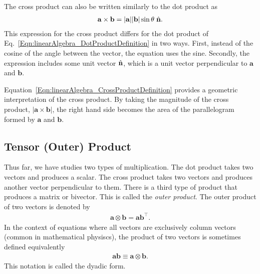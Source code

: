 The cross product can also be written similarly to the dot product as
\begin{align} \label{Eqn:linearAlgebra_CrossProductDefinition}
  \mathbf{a} \times \mathbf{b} = | \mathbf{a} | | \mathbf{b} | \sin \theta \hspace{0.1cm} \hat{\mathbf{n}}.
\end{align}
This expression for the cross product differs for the dot product of Eq.~\eqref{Eqn:linearAlgebra_DotProductDefinition} in two ways. First, instead of the cosine of the angle between the vector, the equation uses the sine. Secondly, the expression includes some unit vector $\hat{\mathbf{n}}$, which is a unit vector perpendicular to $\mathbf{a}$ and $\mathbf{b}$.

Equation~\eqref{Eqn:linearAlgebra_CrossProductDefinition} provides a geometric interpretation of the cross product. By taking the magnitude of the cross product, $| \mathbf{a} \times \mathbf{b} |$, the right hand side becomes the area of the parallelogram formed by $\mathbf{a}$ and $\mathbf{b}$.

\subsection{Tensor (Outer) Product}

Thus far, we have studies two types of multiplication. The dot product takes two vectors and produces a scalar. The cross product takes two vectors and produces another vector perpendicular to them. There is a third type of product that produces a matrix or bivector. This is called the \emph{outer product}. The outer product of two vectors is denoted by
\begin{align}
  \mathbf{a} \otimes \mathbf{b} = \mathbf{a} \mathbf{b}^\top.
\end{align}
In the context of equations where all vectors are exclusively column vectors (common in mathematical physiscs), the product of two vectors is sometimes defined equivalently 
\begin{align}
  \mathbf{a b} \equiv \mathbf{a} \otimes \mathbf{b} .
\end{align}
This notation is called the dyadic form.

